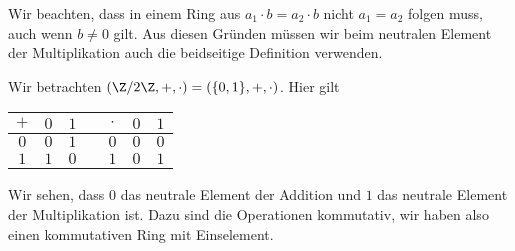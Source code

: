 \documentclass[letterpaper,10pt,english]{jupyterBook}
\begin{document}
Wir beachten, dass in einem Ring aus \(a_1 \cdot b = a_2 \cdot b\) nicht \(a_1=a_2\) folgen muss, auch wenn \(b\neq 0\) gilt. Aus diesen Gründen müssen wir beim neutralen Element der Multiplikation auch die beidseitige Definition verwenden.
\label{grundlagen/zahlensysteme:example-7}
\begin{example}{}{}



Wir betrachten \((\Z/2\Z, +,\cdot)=(\{0,1\},+,\cdot)\). Hier gilt


\begin{center}
\centering
\begin{tabularx}{\linewidth}[{\linewidth}]{|c|c|c|c|c|c|c|}\hline
 
\(+\)
& 
\(0\)
& 
\(1\)
&

& 
\(\cdot\)
& 
\(0\)
& 
\(1\)
\\
\hline
\(0\)
&
\(0\)
&
\(1\)
&

&
\(0\)
&
\(0\)
&
\(0\)
\\
\hline
\(1\)
&
\(1\)
&
\(0\)
&

&
\(1\)
&
\(0\)
&
\(1\)
\\
\hline
\end{tabularx}
\end{center}

Wir sehen, dass \(0\) das neutrale Element der Addition und \(1\) das neutrale Element der Multiplikation ist. Dazu sind die Operationen kommutativ, wir haben also einen kommutativen Ring mit Einselement.
\end{example}
\label{grundlagen/zahlensysteme:example-8}
\end{document}
